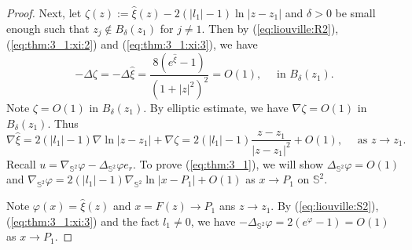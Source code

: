 \documentclass[12pt]{article}
\newcommand{\bS}{\mathbb{S}}
\begin{document}
\begin{proof}
	Next, let $\zeta(z):=\hat{\xi}(z)-2(|l_1|-1)\ln |z-z_1|$ and $\delta>0$ be small enough such that $z_j\notin B_{\delta}(z_1)$ for $j\ne 1$. Then by (\ref{eq:liouville:R2}), (\ref{eq:thm:3_1:xi:2}) and (\ref{eq:thm:3_1:xi:3}), we have 
	\[
		-\Delta\zeta=-\Delta\hat{\xi}= \frac{8(e^{\hat{\xi}}-1)}{(1+|z|^2)^2}=O(1), \quad \textrm{ in }B_\delta(z_1).
	\]
	Note $\zeta=O(1)$ in $B_{\delta}(z_1)$. By elliptic estimate, we have $\nabla \zeta=O(1)$ in $B_{\delta}(z_1)$. Thus 
	\begin{equation}\label{eq:thm:3_1:nabla:xi}
		\nabla \hat{\xi}=2(|l_1|-1)\nabla \ln |z-z_1|+\nabla \zeta=2(|l_1|-1)\frac{z-z_1}{|z-z_1|^2}+O(1), \quad \textrm{ as }z\to z_1. 
	\end{equation}
	Recall $u=\nabla_{\bS^2} \varphi-\Delta_{\bS^2} \varphi e_r$. To prove (\ref{eq:thm:3_1}), we will show $\Delta_{\bS^2} \varphi =O(1)$ and $\nabla_{\bS^2} \varphi=2(|l_1|-1)\nabla_{\bS^2}\ln |x-P_1|+O(1)$ as $x\to P_1$ on $\bS^2$. 

	Note $\varphi(x)=\hat{\xi}(z)$ and $x=F(z)\to P_1$ ans $z\to z_1$. By (\ref{eq:liouville:S2}), (\ref{eq:thm:3_1:xi:3}) and the fact $l_1\ne 0$, we have $-\Delta_{\bS^2}\varphi=2(e^{\varphi}-1)=O(1)$ as $x\to P_1$. 
	

\end{proof}
\end{document}
